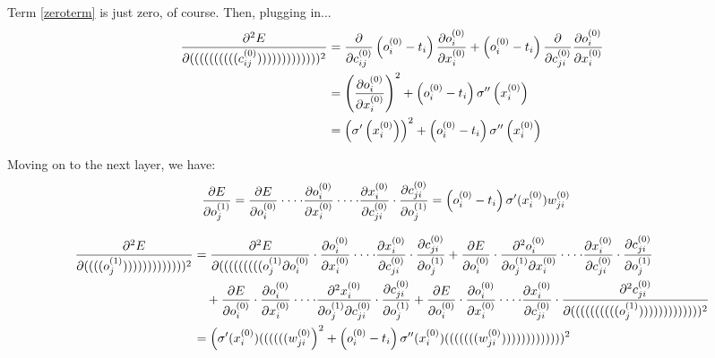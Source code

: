 \documentclass{article}
\newcommand{\Out}[2]{o_{#1}^{(#2)}}
\newcommand{\Target}[1]{t_{#1}}
\newcommand{\Input}[2]{x_{#1}^{(#2)}}
\newcommand{\Weight}[3]{w_{#1#2}^{(#3)}}
\newcommand{\Con}[3]{c_{#1#2}^{(#3)}}
\begin{document}
Term \ref{zeroterm} is just zero, of course. Then, plugging in...
\begin{align}
\pdv[2]{E}{((((((((((\Con i j 0)))))))))))))} &= \pdv{}{\Con i j 0}\left(\Out i 0 - \Target i \right) \pdv{\Out i 0}{\Input i 0} + \left(\Out i 0 - \Target i \right) \pdv{}{\Con j i 0} \pdv{\Out i 0}{\Input i 0}\\
&= \left(\pdv{\Out i 0}{\Input i 0}\right)^2 + \left(\Out i 0 - \Target i \right) \sigma''\left(\Input i 0\right)\\
&= \left(\sigma'\left(\Input i 0\right)\right)^2 + \left(\Out i 0 - \Target i \right) \sigma''\left(\Input i 0\right)
\end{align}

Moving on to the next layer, we have:
\begin{align}
\pdv{E}{\Out j 1} &= \pdv{E}{\Out i 0}
\cdot
\cdot
\cdot
\cdot\pdv{\Out i 0}{\Input i 0}
\cdot
\cdot
\cdot
\cdot\pdv{\Input i 0}{\Con j i 0}
\cdot\pdv{\Con j i 0}{\Out j 1}
= \left(\Out i 0 - \Target i\right)\sigma'(\Input i 0)\Weight j i 0
\end{align}

\begin{align}
\pdv[2]{E}{((((\Out j 1)))))))))))))} &= \pdv[2]{E}{(((((((((\Out j 1}{\Out i 0}
\cdot\pdv{\Out i 0}{\Input i 0}
\cdot
\cdot
\cdot
\cdot\pdv{\Input i 0}{\Con j i 0}
\cdot\pdv{\Con j i 0}{\Out j 1}
+ \pdv{E}{\Out i 0}
\cdot\pdv[2]{\Out i 0}{\Out j 1}{\Input i 0}
\cdot
\cdot
\cdot
\cdot\pdv{\Input i 0}{\Con j i 0}
\cdot\pdv{\Con j i 0}{\Out j 1} \notag \\
&\quad+ \pdv{E}{\Out i 0}
\cdot\pdv{\Out i 0}{\Input i 0}
\cdot
\cdot
\cdot
\cdot\pdv[2]{\Input i 0}{\Out j 1}{\Con j i 0}
\cdot\pdv{\Con j i 0}{\Out j 1}
+ \pdv{E}{\Out i 0}
\cdot\pdv{\Out i 0}{\Input i 0}
\cdot
\cdot
\cdot
\cdot\pdv{\Input i 0}{\Con j i 0}
\cdot\pdv[2]{\Con j i 0}{((((((((((\Out j 1)))))))))))))} \\
&= \left(\sigma'(\Input i 0)((((((\Weight j i 0\right)^2 + \left(\Out i 0 - \Target i\right)\sigma''(\Input i 0)(((((((\Weight j i 0)))))))))))))^2
\end{align}
\end{document}
